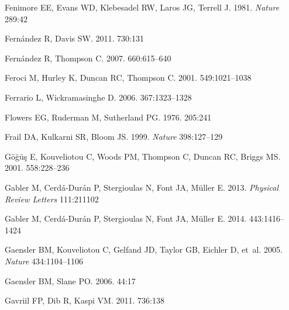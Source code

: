 \documentclass[letterpaper]{ar-1col}
\begin{document}
\begin{thebibliography}{}
{Fenimore} EE, {Evans} WD, {Klebesadel} RW, {Laros} JG, {Terrell} J. 1981.
\textit{Nature} 289:42

{Fern{\'a}ndez} R, {Davis} SW. 2011.
\textit{\apj} 730:131

{Fern{\'a}ndez} R, {Thompson} C. 2007.
\textit{\apj} 660:615--640

{Feroci} M, {Hurley} K, {Duncan} RC, {Thompson} C. 2001.
\textit{\apj} 549:1021--1038

{Ferrario} L, {Wickramasinghe} D. 2006.
\textit{\mnras} 367:1323--1328

Flowers EG, Ruderman M, Sutherland PG. 1976.
\textit{\apj} 205:241

Frail DA, Kulkarni SR, Bloom JS. 1999.
\textit{Nature} 398:127--129

{G{\" o}{\u g}{\" u}{\c s}} E, {Kouveliotou} C, {Woods} PM, {Thompson} C,
  {Duncan} RC, {Briggs} MS. 2001.
\textit{\apj} 558:228--236

{Gabler} M, {Cerd{\'a}-Dur{\'a}n} P, {Stergioulas} N, {Font} JA, {M{\"u}ller}
  E. 2013.
\textit{Physical Review Letters} 111:211102

{Gabler} M, {Cerd{\'a}-Dur{\'a}n} P, {Stergioulas} N, {Font} JA, {M{\"u}ller}
  E. 2014.
\textit{\mnras} 443:1416--1424

Gaensler BM, Kouveliotou C, Gelfand JD, Taylor GB, Eichler D, et~al. 2005.
\textit{Nature} 434:1104--1106

{Gaensler} BM, {Slane} PO. 2006.
\textit{\araa} 44:17

{Gavriil} FP, {Dib} R, {Kaspi} VM. 2011.
\textit{\apj} 736:138


\end{thebibliography}
\end{document}

